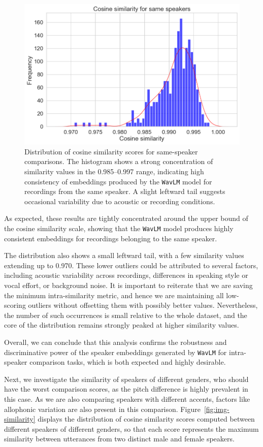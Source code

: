 \documentclass[conference]{IEEEtran}
\begin{document}
	\begin{figure}[H]
		\centering
		\includegraphics[width=0.7\linewidth]{img/img-self-similarity}
		\caption{Distribution of cosine similarity scores for same-speaker comparisons. The histogram shows a strong concentration of similarity values in the 0.985–0.997 range, indicating high consistency of embeddings produced by the \texttt{WavLM} model for recordings from the same speaker. A slight leftward tail suggests occasional variability due to acoustic or recording conditions.}
		\label{fig:img-self-similarity}
	\end{figure}
	
	As expected, these results are tightly concentrated around the upper bound of the cosine similarity scale, showing that the \texttt{WavLM} model produces highly consistent embeddings for recordings belonging to the same speaker. 
	
	The distribution also shows a small leftward tail, with a few similarity values extending up to 0.970. These lower outliers could be attributed to several factors, including acoustic variability across recordings, differences in speaking style or vocal effort, or background noise. It is important to reiterate that we are saving the minimum intra-similarity metric, and hence we are maintaining all low-scoring outliers without offsetting them with possibly better values. Nevertheless, the number of such occurrences is small relative to the whole dataset, and the core of the distribution remains strongly peaked at higher similarity values.
	
	Overall, we can conclude that this analysis confirms the robustness and discriminative power of the speaker embeddings generated by \texttt{WavLM} for intra-speaker comparison tasks, which is both expected and highly desirable.
	
	Next, we investigate the similarity of speakers of different genders, who should have the worst comparison scores, as the pitch difference is highly prevalent in this case. As we are also comparing speakers with different accents, factors like allophonic variation are also present in this comparison. Figure~\ref{fig:img-similarity} displays the distribution of cosine similarity scores computed between different speakers of different genders, so that each score represents the maximum similarity between utterances from two distinct male and female speakers.
	
\end{document}
